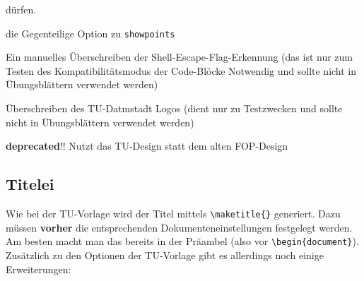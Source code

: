 \documentclass[
    titleprefix=AlgoTeX,
    inlineshortcut=java,
    corporatedesign,
    boxarc,
]{algoexercise}
\begin{document}
\begin{description}[leftmargin = 3cm]
            dürfen.
        \item[hidepoints] die Gegenteilige Option zu \verb+showpoints+
        \item[shell\_escape] Ein manuelles Überschreiben der Shell-Escape-Flag-Erkennung (das ist nur zum Testen des
            Kompatibilitätsmodus der Code-Blöcke Notwendig und sollte nicht in Übungsblättern verwendet werden)
        \item[logopath] Überschreiben des TU-Datmstadt Logos (dient nur zu Testzwecken und sollte nicht in Übungsblättern
            verwendet
            werden)
        \item[corporatedesign] \textbf{deprecated}!!
            Nutzt das TU-Design statt dem alten FOP-Design
    \end{description}
    \vspace{-1em} \subsection{Titelei} \vspace{-1em}\sloppy Wie bei
    der TU-Vorlage wird der Titel mittels \verb+\maketitle{}+ generiert.
    Dazu müssen \textbf{vorher} die entsprechenden Dokumenteneinstellungen festgelegt werden.
    Am besten macht man das bereits in der Präambel (also vor \verb+\begin{document}+).
    Zusätzlich zu den Optionen der TU-Vorlage gibt es allerdings noch einige Erweiterungen:
\end{document}
